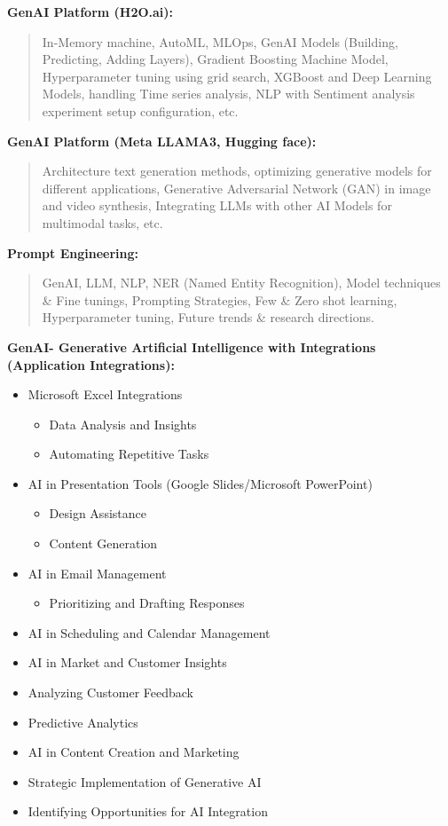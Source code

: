 \documentclass[a4paper]{article}
\begin{document}
\textbf{GenAI Platform (H2O.ai):}

\begin{quote}
In-Memory machine, AutoML, MLOps, GenAI Models (Building, Predicting,
Adding Layers), Gradient Boosting Machine Model, Hyperparameter tuning
using grid search, XGBoost and Deep Learning Models, handling Time
series analysis, NLP with Sentiment analysis experiment setup
configuration, etc.
\end{quote}

\textbf{GenAI Platform (Meta LLAMA3, Hugging face):}

\begin{quote}
Architecture text generation methods, optimizing generative models for
different applications, Generative Adversarial Network (GAN) in image
and video synthesis, Integrating LLMs with other AI Models for
multimodal tasks, etc.
\end{quote}

\textbf{Prompt Engineering:}

\begin{quote}
GenAI, LLM, NLP, NER (Named Entity Recognition), Model techniques \&
Fine tunings, Prompting Strategies, Few \& Zero shot learning,
Hyperparameter tuning, Future trends \& research directions.
\end{quote}

\textbf{GenAI- Generative Artificial Intelligence with Integrations
(Application Integrations):}

\begin{itemize}
\item
  Microsoft Excel Integrations

  \begin{itemize}
  \item
    Data Analysis and Insights
  \item
    Automating Repetitive Tasks
  \end{itemize}
\item
  AI in Presentation Tools (Google Slides/Microsoft PowerPoint)

  \begin{itemize}
  \item
    Design Assistance
  \item
    Content Generation
  \end{itemize}
\item
  AI in Email Management

  \begin{itemize}
  \item
    Prioritizing and Drafting Responses
  \end{itemize}
\item
  AI in Scheduling and Calendar Management
\item
  AI in Market and Customer Insights
\item
  Analyzing Customer Feedback
\item
  Predictive Analytics
\item
  AI in Content Creation and Marketing
\item
  Strategic Implementation of Generative AI
\item
  Identifying Opportunities for AI Integration
\end{itemize}
\end{document}
